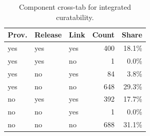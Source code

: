 \begin{table}[t]
\centering
\caption{Component cross-tab for integrated curatability.}
\label{tab:curatability-components}
\small
\begin{tabular}{lllrr}
\toprule
Prov. & Release & Link & Count & Share \\
\midrule
yes & yes & yes & 400 & 18.1\% \\
yes & yes & no & 1 & 0.0\% \\
yes & no & yes & 84 & 3.8\% \\
yes & no & no & 648 & 29.3\% \\
no & yes & yes & 392 & 17.7\% \\
no & no & yes & 1 & 0.0\% \\
no & no & no & 688 & 31.1\% \\
\bottomrule
\end{tabular}
\end{table}
